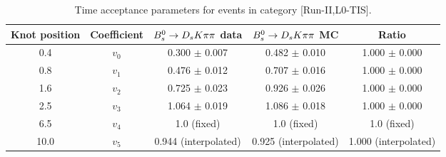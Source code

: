 \begin{table}[hp!]
\centering
\small
\caption{Time acceptance parameters for events in category [\textsf{Run-II},\textsf{L0-TIS}].}
\begin{tabular}{c c c c c}
\hline
\hline
Knot position & Coefficient & ${{B}^0_{s}}\rightarrow{\ensuremath{{D}_{s}}}{\ensuremath{K}}{\ensuremath{\pi}}{\ensuremath{\pi}}$ data & ${{B}^0_{s}}\rightarrow{\ensuremath{{D}_{s}}}{\ensuremath{K}}{\ensuremath{\pi}}{\ensuremath{\pi}}$ MC & Ratio \\
\hline
0.4 & $v_{0}$ & 0.300 $\pm$ 0.007 & 0.482 $\pm$ 0.010 & 1.000 $\pm$ 0.000\\
0.8 & $v_{1}$ & 0.476 $\pm$ 0.012 & 0.707 $\pm$ 0.016 & 1.000 $\pm$ 0.000\\
1.6 & $v_{2}$ & 0.725 $\pm$ 0.023 & 0.926 $\pm$ 0.026 & 1.000 $\pm$ 0.000\\
2.5 & $v_{3}$ & 1.064 $\pm$ 0.019 & 1.086 $\pm$ 0.018 & 1.000 $\pm$ 0.000\\
6.5 & $v_{4}$ &  1.0 (fixed) & 1.0 (fixed) & 1.0 (fixed)\\
10.0 & $v_{5}$ & 0.944 (interpolated) & 0.925 (interpolated) & 1.000 (interpolated) \\
\hline
\hline
\end{tabular}
\label{table:splines}
\end{table}